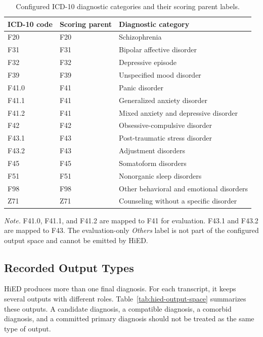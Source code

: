 \begin{table}[htbp]
\centering
\caption{Configured ICD-10 diagnostic categories and their scoring parent labels.}
\label{tab:configured-profile-summary}
\small
\begin{tabularx}{\textwidth}{|p{3.0cm}|p{2.2cm}|X|}
\hline
ICD-10 code & Scoring parent & Diagnostic category\\
\hline
F20 & F20 & Schizophrenia\\
\hline
F31 & F31 & Bipolar affective disorder\\
\hline
F32 & F32 & Depressive episode\\
\hline
F39 & F39 & Unspecified mood disorder\\
\hline
F41.0 & F41 & Panic disorder\\
\hline
F41.1 & F41 & Generalized anxiety disorder\\
\hline
F41.2 & F41 & Mixed anxiety and depressive disorder\\
\hline
F42 & F42 & Obsessive-compulsive disorder\\
\hline
F43.1 & F43 & Post-traumatic stress disorder\\
\hline
F43.2 & F43 & Adjustment disorders\\
\hline
F45 & F45 & Somatoform disorders\\
\hline
F51 & F51 & Nonorganic sleep disorders\\
\hline
F98 & F98 & Other behavioral and emotional disorders\\
\hline
Z71 & Z71 & Counseling without a specific disorder\\
\hline
\end{tabularx}

\vspace{0.4em}
\begin{minipage}{0.96\textwidth}
\footnotesize
\textit{Note.} F41.0, F41.1, and F41.2 are mapped to F41 for evaluation. F43.1 and F43.2 are mapped to F43. The evaluation-only \emph{Others} label is not part of the configured output space and cannot be emitted by HiED.
\end{minipage}
\end{table}

\subsection{Recorded Output Types}
\label{sec:diagnostic-output-roles}

HiED produces more than one final diagnosis. For each transcript, it keeps several outputs with different roles. Table~\ref{tab:hied-output-space} summarizes these outputs. A candidate diagnosis, a compatible diagnosis, a comorbid diagnosis, and a committed primary diagnosis should not be treated as the same type of output.

